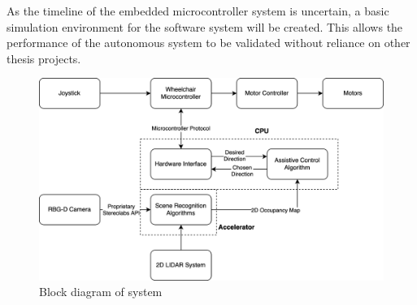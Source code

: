 As the timeline of the embedded microcontroller system is uncertain, a basic simulation environment for the software system will be created.
This allows the performance of the autonomous system to be validated without reliance on other thesis projects.
\begin{figure}[H]
    \centering
    \includegraphics[width=\linewidth]{images/block_diagram.png}
    \caption{Block diagram of system}
    \label{fig:block_diagram}
\end{figure}
\pagebreak


